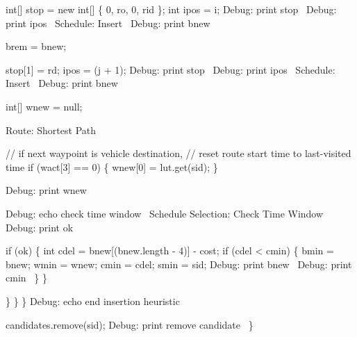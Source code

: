             int[] stop = new int[] \{ 0, ro, 0, rid \};
            int ipos = i;
            \LA{}Debug: print stop~{\nwtagstyle{}}\RA{}
            \LA{}Debug: print ipos~{\nwtagstyle{}}\RA{}
            \LA{}Schedule: Insert~{\nwtagstyle{}}\RA{}
            \LA{}Debug: print bnew~{\nwtagstyle{}}\RA{}

            brem = bnew;

            stop[1] = rd;
            ipos = (j + 1);
            \LA{}Debug: print stop~{\nwtagstyle{}}\RA{}
            \LA{}Debug: print ipos~{\nwtagstyle{}}\RA{}
            \LA{}Schedule: Insert~{\nwtagstyle{}}\RA{}
            \LA{}Debug: print bnew~{\nwtagstyle{}}\RA{}

            int[] wnew = null;

            \LA{}Route: Shortest Path~{\nwtagstyle{}}\RA{}

            // if next waypoint is vehicle destination,
            // reset route start time to last-visited time
            if (wact[3] == 0) \{
              wnew[0] = lut.get(sid);
            \}

            \LA{}Debug: print wnew~{\nwtagstyle{}}\RA{}

            \LA{}Debug: echo check time window~{\nwtagstyle{}}\RA{}
            \LA{}Schedule Selection: Check Time Window~{\nwtagstyle{}}\RA{}
            \LA{}Debug: print ok~{\nwtagstyle{}}\RA{}

            if (ok) \{
              int cdel = bnew[(bnew.length - 4)] - cost;
              if (cdel < cmin) \{
                bmin = bnew;
                wmin = wnew;
                cmin = cdel;
                smin = sid;
                \LA{}Debug: print bnew~{\nwtagstyle{}}\RA{}
                \LA{}Debug: print cmin~{\nwtagstyle{}}\RA{}
              \}
            \}

          \}
        \}
      \}
      \LA{}Debug: echo end insertion heuristic~{\nwtagstyle{}}\RA{}

      candidates.remove(sid);
      \LA{}Debug: print remove candidate~{\nwtagstyle{}}\RA{}
    \}

